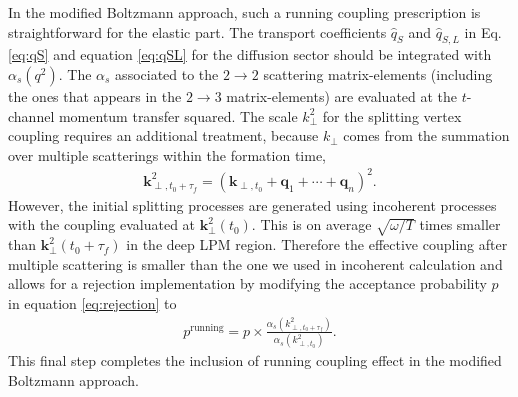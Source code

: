 \documentclass[aps, prc, reprint, amsmath, groupedaddress, nofootinbib]{revtex4-1}
\begin{document}
In the modified Boltzmann approach, such a running coupling prescription is straightforward for the elastic part.
The transport coefficients $\hat{q}_S$ and $\hat{q}_{S, L}$ in Eq. \ref{eq:qS} and equation \ref{eq:qSL} for the diffusion sector should be integrated with $\alpha_s(q^2)$.
The $\alpha_s$ associated to the $2\rightarrow 2$ scattering matrix-elements (including the ones that appears in the $2\rightarrow 3$ matrix-elements) are evaluated at the $t$-channel momentum transfer squared.
The scale $k_\perp^2$ for the splitting vertex coupling requires an additional treatment, because $k_\perp$ comes from the summation over multiple scatterings within the formation time,
\begin{eqnarray}\label{eq:kTn}
\mathbf{k}_{\perp, t_0+\tau_f}^2 = \left(\mathbf{k}_{\perp,t_0}+\mathbf{q}_1+\cdots+\mathbf{q}_n\right)^2.
\end{eqnarray} 
However, the initial splitting processes are generated using incoherent processes with the coupling evaluated at $\mathbf{k}_{\perp}^2(t_0)$.
This is on average $\sqrt{\omega/T}$ times smaller than $\mathbf{k}_{\perp}^2(t_0+\tau_f)$ in the deep LPM region.
Therefore the effective coupling after multiple scattering is smaller than the one we used in incoherent calculation and allows for a rejection implementation by modifying the acceptance probability $p$ in equation \ref{eq:rejection} to
\begin{eqnarray}
p^{\textrm{running}} = p\times \frac{\alpha_s(k_{\perp,t_0+\tau_f}^2)}{\alpha_s(k_{\perp,t_0}^2)}.
\end{eqnarray}
This final step completes the inclusion of running coupling effect in the modified Boltzmann approach.
\end{document}

